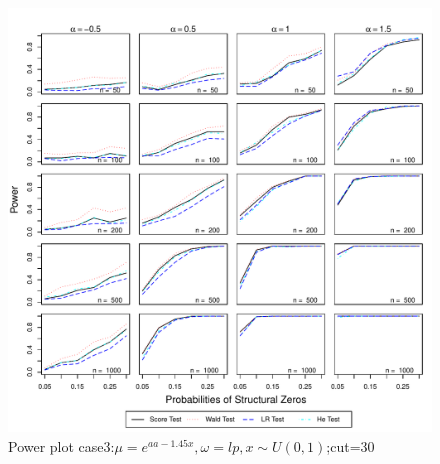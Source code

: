 \documentclass[11pt]{article}
\numberwithin{equation}{section}
\begin{document}
\begin{figure}
  \centering
  \includegraphics[width=\columnwidth]{./figure/p/p303.pdf}
  \caption{Power plot case3:$\mu=e^{aa-1.45x},\omega=lp,x\sim U(0,1)$;cut=30}
\end{figure}


\end{document}
